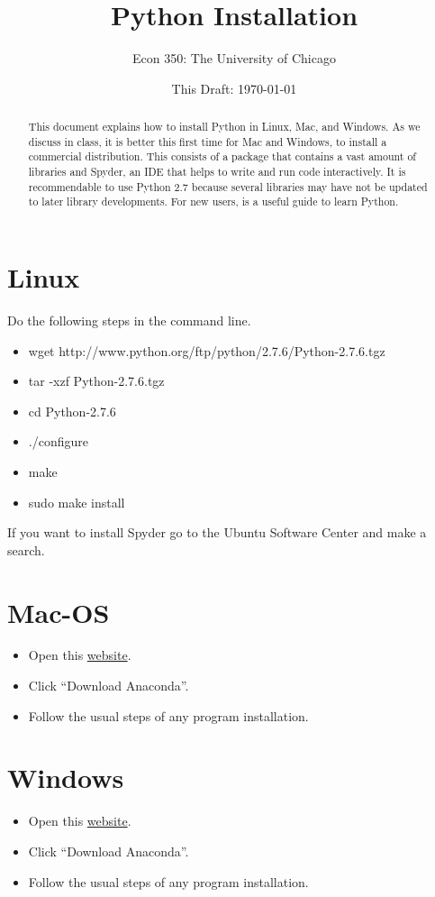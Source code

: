 



\title{Python Installation}
\author{Econ 350: The University of Chicago}
\date{This Draft: \today}
\maketitle

\begin{abstract}
\noindent This document explains how to install Python in Linux, Mac, and Windows. As we discuss in class, it is better this first time for Mac and Windows, to install a commercial distribution. This consists of a package that contains a vast amount of libraries and Spyder, an IDE that helps to write and run code interactively. It is recommendable to use Python 2.7 because several libraries may have not be updated to later library developments. For new users, \citet{langtangen2011primer} is a useful guide to learn Python.
\end{abstract}

\section{Linux}
Do the following steps in the command line.
\begin{itemize}
\item wget http://www.python.org/ftp/python/2.7.6/Python-2.7.6.tgz
\item tar -xzf Python-2.7.6.tgz  
\item cd Python-2.7.6
\item ./configure
\item make
\item sudo make install
\end{itemize}
If you want to install Spyder go to the Ubuntu Software Center and make a search. 




\section{Mac-OS}
\begin{itemize}
\item Open this \href{https://store.continuum.io/cshop/anaconda/}{website}.
\item Click ``Download Anaconda''.
\item Follow the usual steps of any program installation.
\end{itemize}

\section{Windows}
\begin{itemize}
\item Open this \href{https://store.continuum.io/cshop/anaconda/}{website}.
\item Click ``Download Anaconda''.
\item Follow the usual steps of any program installation.
\end{itemize}